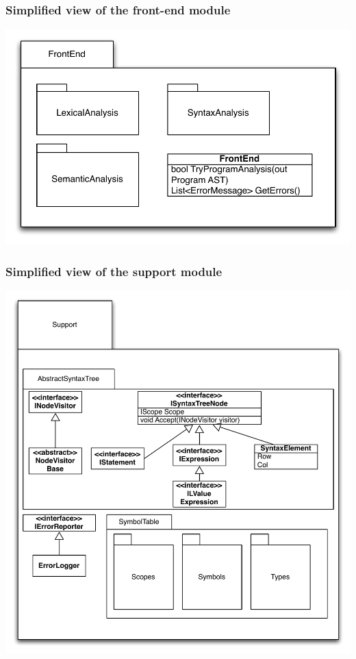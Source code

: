 \documentclass[a4paper,11pt]{article}
\begin{document}
\subsubsection{Simplified view of the front-end module}

\includegraphics[width=1.0\textwidth]{frontend.pdf}

\subsubsection{Simplified view of the support module}

\includegraphics[width=1.0\textwidth]{support.pdf}
\end{document}
